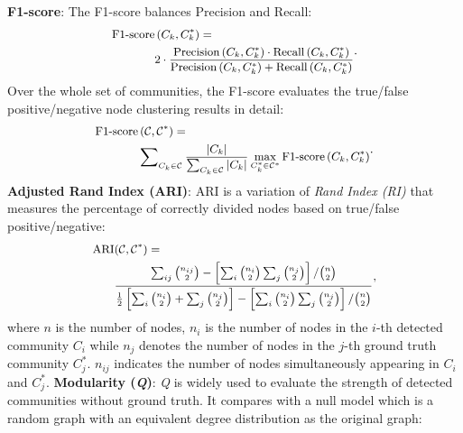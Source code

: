 \vspace{2mm}
\noindent
\textbf{F1-score}: The F1-score balances Precision and Recall: 
\begin{equation}
\small
\begin{aligned}
\operatorname{F1-score}&\left(C_{k}, C^*_{k}\right)=\\
& 2 \cdot \frac{\operatorname{Precision}\left(C_{k}, C^*_{k}\right) \cdot \operatorname{Recall}\left(C_{k}, C^*_{k}\right)}{\operatorname{Precision}\left(C_{k}, C^*_{k}\right)+\operatorname{Recall}\left(C_{k}, C^*_{k}\right)}
\end{aligned}.
\end{equation}
Over the whole set of communities, the F1-score evaluates the true/false positive/negative node clustering results in detail:
\begin{equation}
\small
\begin{aligned}
\operatorname{F1-score}&\left(\mathcal{C}, \mathcal{C}^*\right)= \\
&\sum\nolimits_{C_{k}\in \mathcal{C}} \frac{|C_{k}|}{\sum_{C_{k}\in \mathcal{C}} |C_{k}|} \max\limits_{C_{k}^{*}\in \mathcal{C}^{*}} \operatorname{F1-score}\left(C_{k}, C_{k}^{*} \right)
\end{aligned}. 
\end{equation}
\vspace{2mm}
\noindent
\textbf{Adjusted Rand Index (ARI)}: ARI is a variation of \textit{Rand Index (RI)} that measures the percentage of correctly divided nodes based on true/false positive/negative:
\begin{equation}
\small
\begin{aligned}
\operatorname{ARI}&(\mathcal{C}, \mathcal{C}^*) = \\ &\frac{\sum_{ij}\tbinom{n_{ij}}{2}-\left[\sum_i \tbinom{n_{i}}{2}\sum_{j} \tbinom{n_{j}}{2}\right]/\tbinom{n}{2}}{\frac{1}{2}\left[\sum_{i} \tbinom{n_{i}}{2}+\sum_{j} \tbinom{n_{j}}{2}\right]-\left[\sum_{i} \tbinom{n_{i}}{2}\sum_{j} \tbinom{n_{j}}{2}\right]/\tbinom{n}{2}}
\end{aligned}, 
\end{equation}
where $n$ is the number of nodes, 
$n_{i}$ is the number of nodes in the $i$-th detected community $C_{i}$ while $n_{j}$ denotes the number of nodes in the $j$-th ground truth community $C_{j}^{*}$. $n_{ij}$ indicates the number of nodes simultaneously appearing in $C_{i}$ and $C_{j}^{*}$.
\vspace{2mm}
\noindent	
\textbf{Modularity (\textit{Q})}: \textit{Q} is widely used to evaluate the strength of detected communities without ground truth. It compares with a null model which is a random graph with an equivalent degree distribution as the original graph:  
